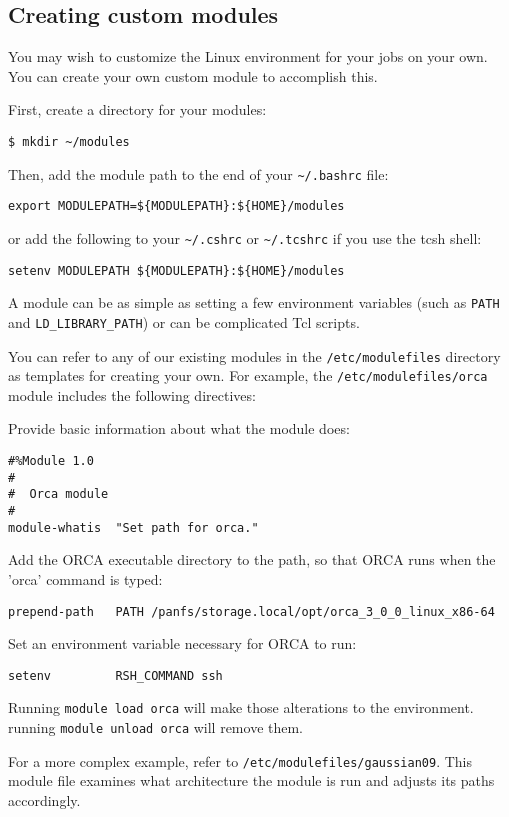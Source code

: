 \documentclass[12pt,a4paper]{article}
\begin{document}
\subsection*{Creating custom modules}
You may wish to customize the Linux environment for your jobs on your own. You can create your own custom module to accomplish this.

First, create a directory for your modules:
\begin{verbatim}
$ mkdir ~/modules
\end{verbatim}
Then, add the module path to the end of your \texttt{\textasciitilde{}/.bashrc} file:
\begin{verbatim}
export MODULEPATH=${MODULEPATH}:${HOME}/modules
\end{verbatim}
or add the following to your \texttt{\textasciitilde{}/.cshrc} or \texttt{\textasciitilde{}/.tcshrc} if you use the tcsh shell:
\begin{verbatim}
setenv MODULEPATH ${MODULEPATH}:${HOME}/modules
\end{verbatim}
A module can be as simple as setting a few environment variables (such as \texttt{PATH} and \texttt{LD\_LIBRARY\_PATH}) or can be complicated Tcl scripts.

You can refer to any of our existing modules in the \texttt{/etc/modulefiles} directory as templates for creating your own. For example, the \texttt{/etc/modulefiles/orca} module includes the following directives:

Provide basic information about what the module does:
\begin{verbatim}
#%Module 1.0
#
#  Orca module
#
module-whatis  "Set path for orca."
\end{verbatim}
Add the ORCA executable directory to the path, so that ORCA runs when the 'orca' command is typed:
\begin{verbatim}
prepend-path   PATH /panfs/storage.local/opt/orca_3_0_0_linux_x86-64
\end{verbatim}
Set an environment variable necessary for ORCA to run:
\begin{verbatim}
setenv         RSH_COMMAND ssh
\end{verbatim}
Running \texttt{module load orca} will make those alterations to the environment. running \texttt{module unload orca} will remove them.

For a more complex example, refer to \texttt{/etc/modulefiles/gaussian09}. This module file examines what architecture the module is run and adjusts its paths accordingly.
\end{document}

